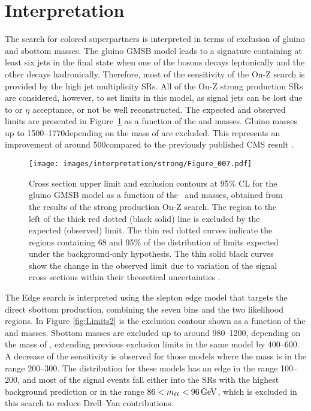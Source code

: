 \section{Interpretation}
\noindent\justify
The search for colored superpartners is interpreted in terms of exclusion of gluino and sbottom masses. 
The gluino GMSB model leads to a signature containing at least six jets in the final state when one of the \PZ bosons decays leptonically and the other decays hadronically.  
Therefore, most of the sensitivity of the On-Z search is provided by the high jet multiplicity SRs.
All of the On-Z strong production SRs are considered, however, to set limits in this model, as signal jets can be lost due to \pt or $\eta$ acceptance, or not be well reconstructed.
The expected and observed limits are presented in Figure~\ref{fig:Limits1} as a function of the \gluino  and \firstchi masses.
Gluino masses up to 1500--1770\GeV depending on the mass of \firstchi are excluded.
This represents an improvement of around 500\GeV compared to the previously published CMS result \cite{Khachatryan:2015lwa}.
\begin{figure}[!hb]
 \centering
   \texttt{[image: images/interpretation/strong/Figure\_007.pdf]}
   \caption{\label{fig:Limits1}
Cross section upper limit and exclusion contours at 95\% CL for the gluino GMSB model as a function of the \gluino~and \firstchi masses, obtained from the results of the strong production On-Z search.
The region to the left of the thick red dotted (black solid) line is excluded by the expected (observed) limit.
The thin red dotted curves indicate the regions containing 68 and 95\% of the distribution of limits expected under the background-only hypothesis. 
The thin solid black curves show the change in the observed limit due to variation of the signal cross sections within their theoretical uncertainties \cite{Sirunyan:2017qaj}.}
\end{figure}
\newpara
\noindent\justify
The Edge search is interpreted using the slepton edge model that targets the direct sbottom production, combining the seven \mll bins and the two \ttbar likelihood regions.
In Figure \ref{fig:Limits2} is the exclusion contour shown as a function of the \sbottom and \secondchi masses. 
Sbottom masses are excluded up to around 980--1200\GeV, depending on the mass of \secondchi, extending previous exclusion limits in the same model by 400--600\GeV.
A decrease of the sensitivity is observed for those models where the \secondchi mass is in the range 200--300\GeV.
The \mll distribution for these models has an edge in the range 100--200\GeV, and most of the signal events fall either into the SRs with the highest background prediction or in the range $86 < m_{\ell\ell} < 96\,\text{Ge\hspace{-.08em}V}$, which is excluded in this search to reduce Drell--Yan contributions.
